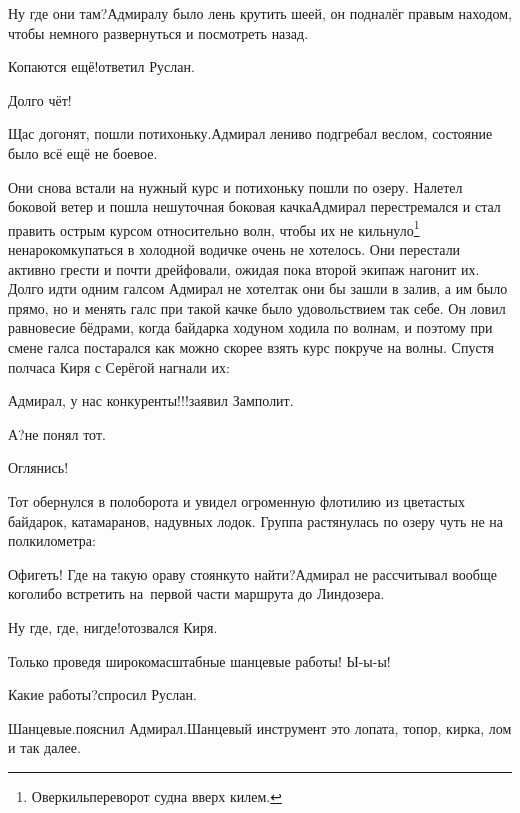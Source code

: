 \diagdash Ну где они там?\mdash Адмиралу было лень крутить шеей, он подналёг правым находом, чтобы немного развернуться и посмотреть назад.

\diagdash Копаются ещё!\mdash ответил Руслан.

\diagdash Долго чёт!

\diagdash Щас догонят, пошли потихоньку.\mdash Адмирал лениво подгребал веслом, состояние было всё ещё не боевое.

\renewcommand*{\thefootnote}{\fnsymbol{footnote}}
\setcounter{footnote}{0}
Они снова встали на нужный курс и потихоньку пошли по озеру. Налетел боковой ветер и пошла нешуточная боковая качка\mdash Адмирал перестремался и стал править острым курсом относительно волн, чтобы их не кильнуло\footnote{Оверкиль\mdash переворот судна вверх килем.} ненароком\mdash купаться в холодной водичке очень не хотелось. Они перестали активно грести и почти дрейфовали, ожидая пока второй экипаж нагонит их. Долго идти одним галсом Адмирал не хотел\mdash так они бы зашли в залив, а им было прямо, но и менять галс при такой качке было удовольствием так себе. Он ловил равновесие бёдрами, когда байдарка ходуном ходила по волнам, и поэтому при смене галса постарался как можно скорее взять курс покруче на волны. Спустя полчаса Киря с Серёгой нагнали их:


\diagdash Адмирал, у нас конкуренты!!!\mdash заявил Замполит.

\diagdash А?\mdash не понял тот.

\diagdash Оглянись!

Тот обернулся в пол\sdash оборота и увидел огроменную флотилию из цветастых байдарок, катамаранов, надувных лодок. Группа растянулась по озеру чуть не на полкилометра: 

\diagdash Офигеть! Где на такую ораву стоянку\sdash то найти?\mdash Адмирал не рассчитывал вообще кого\sdash либо встретить на~первой части маршрута до Линдозера.

\diagdash Ну где, где, нигде!\mdash отозвался Киря. 

\diagdash Только проведя широкомасштабные шанцевые работы! Ы-ы-ы!

\diagdash Какие работы?\mdash спросил Руслан.

\diagdash Шанцевые.\mdash пояснил Адмирал.\mdash Шанцевый инструмент это лопата, топор, кирка, лом и так далее.

